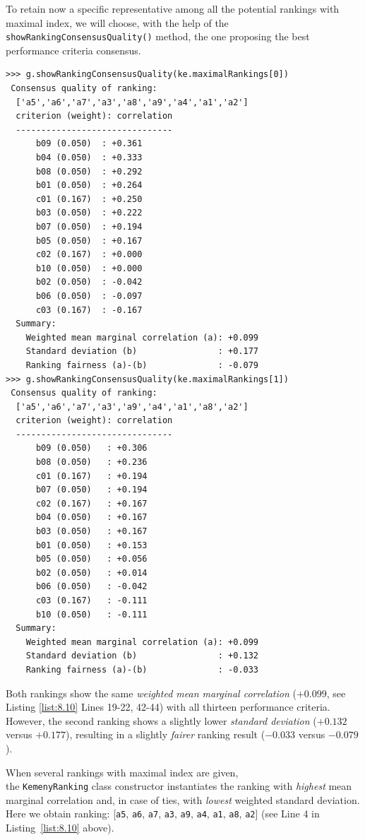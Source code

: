 To retain now a specific representative among all the potential rankings with maximal \Kemeny index, we will choose, with the help of the \\
\texttt{showRankingConsensusQuality()} method, the one proposing the best performance criteria consensus.
\begin{lstlisting}[caption={Computing the consensus quality of a ranking},label=list:8.10]   
>>> g.showRankingConsensusQuality(ke.maximalRankings[0])
 Consensus quality of ranking:
  ['a5','a6','a7','a3','a8','a9','a4','a1','a2']
  criterion (weight): correlation
  -------------------------------
      b09 (0.050)  : +0.361
      b04 (0.050)  : +0.333
      b08 (0.050)  : +0.292
      b01 (0.050)  : +0.264
      c01 (0.167)  : +0.250
      b03 (0.050)  : +0.222
      b07 (0.050)  : +0.194
      b05 (0.050)  : +0.167
      c02 (0.167)  : +0.000
      b10 (0.050)  : +0.000
      b02 (0.050)  : -0.042
      b06 (0.050)  : -0.097
      c03 (0.167)  : -0.167
  Summary:
    Weighted mean marginal correlation (a): +0.099
    Standard deviation (b)                : +0.177
    Ranking fairness (a)-(b)              : -0.079
>>> g.showRankingConsensusQuality(ke.maximalRankings[1])
 Consensus quality of ranking:
  ['a5','a6','a7','a3','a9','a4','a1','a8','a2']
  criterion (weight): correlation
  -------------------------------
      b09 (0.050)   : +0.306
      b08 (0.050)   : +0.236
      c01 (0.167)   : +0.194
      b07 (0.050)   : +0.194
      c02 (0.167)   : +0.167
      b04 (0.050)   : +0.167
      b03 (0.050)   : +0.167
      b01 (0.050)   : +0.153
      b05 (0.050)   : +0.056
      b02 (0.050)   : +0.014
      b06 (0.050)   : -0.042
      c03 (0.167)   : -0.111
      b10 (0.050)   : -0.111
  Summary:
    Weighted mean marginal correlation (a): +0.099
    Standard deviation (b)                : +0.132
    Ranking fairness (a)-(b)              : -0.033
\end{lstlisting}
Both \Kemeny rankings show the same \emph{weighted mean marginal correlation} ($+0.099$, see Listing \ref{list:8.10} Lines 19-22, 42-44) with all thirteen performance criteria. However, the second ranking shows a slightly lower \emph{standard deviation} ($+0.132$ versus $+0.177$), resulting in a slightly \emph{fairer} ranking result ($-0.033$ versus $-0.079$).

When several rankings with maximal \Kemeny index are given,\\ the \texttt{KemenyRanking} class constructor instantiates the ranking with \emph{highest} mean marginal correlation and, in case of ties, with \emph{lowest} weighted standard deviation. Here we obtain ranking: [\texttt{a5}, \texttt{a6}, \texttt{a7}, \texttt{a3}, \texttt{a9}, \texttt{a4}, \texttt{a1}, \texttt{a8}, \texttt{a2}] (see Line 4 in Listing~\ref{list:8.10} above).

